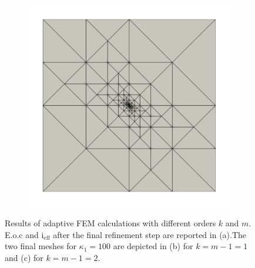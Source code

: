 \begin{figure}
\begin{subfigure}[b]{0.32\textwidth}
        \caption{}
        \label{fig:poisson-riviere_refmesh-p1}
    \end{subfigure}
    \hfill
    \begin{subfigure}[b]{0.32\textwidth}
        \centering
        \includegraphics[width=\textwidth]{Riviere-100_P2_RT3_Mesh.pdf}
        \caption{}
        \label{fig:poisson-riviere_refmesh-p2}
    \end{subfigure}
    \caption{Results of adaptive FEM calculations with different orders $k$ and $m$. E.o.c and $\mathrm{i_{eff}}$ after the final refinement step are reported in (a).The two final meshes for $\kappa_1=100$ are depicted in (b) for $k=m-1=1$ and (c) for $k=m-1=2$.}
    \label{fig:poisson-riviere}
\end{figure}

